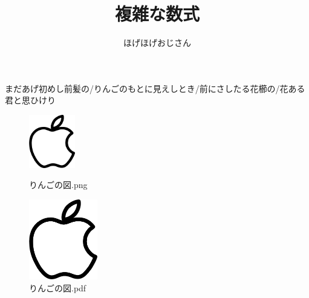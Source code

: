 \documentclass[a4paper, 11pt, uplatex]{jsarticle}
\begin{document}
\title{複雑な数式}
\author{ほげほげおじさん}
\maketitle

まだあげ初めし前髪の/りんごのもとに見えしとき/前にさしたる花櫛の/花ある君と思ひけり
\begin{figure}
	\begin{minipage}[b]{0.45 \linewidth}
		\centering
		\includegraphics[width=2cm]{apple.png}
		\caption{りんごの図.png}
	\end{minipage}
	\begin{minipage}[b]{0.45 \linewidth}
		\centering
		\includegraphics[width=3cm]{apple.pdf}
		\caption{りんごの図.pdf}
	\end{minipage}
\end{figure}
\end{document}
